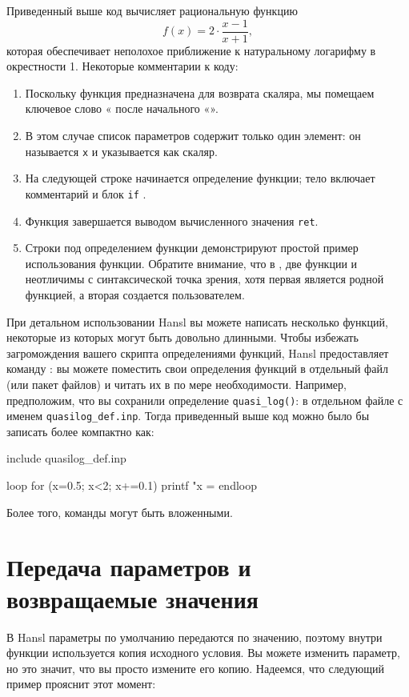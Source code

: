 Приведенный выше код вычисляет рациональную функцию
\[
  f(x) = 2 \cdot \frac{x-1}{x+1} ,
\]
которая обеспечивает неполохое приближение к натуральному логарифму в
окрестности 1. Некоторые комментарии к коду:
\begin{enumerate}
\item Поскольку функция предназначена для возврата скаляра, мы
  помещаем ключевое слово « после начального
  «».
\item В этом случае список параметров содержит только один элемент: он
  называется \texttt{x} и указывается как скаляр.
\item На следующей строке начинается определение функции; тело
  включает комментарий и блок \texttt{if} .
\item Функция завершается выводом вычисленного значения \texttt{ret}.
\item Строки под определением функции демонстрируют простой пример
  использования функции.  Обратите внимание, что в , две
  функции  и  неотличимы с синтаксической
  точка зрения, хотя первая является родной функцией, а вторая
  создается пользователем.
\end{enumerate}

При детальном использовании Hansl вы можете написать несколько
функций, некоторые из которых могут быть довольно длинными. Чтобы
избежать загромождения вашего скрипта определениями функций, Hansl
предоставляет команду : вы можете поместить свои
определения функций в отдельный файл (или пакет файлов) и читать их в
по мере необходимости. Например, предположим, что вы сохранили
определение \verb|quasi_log()|: в отдельном файле с именем
\verb|quasilog_def.inp|. Тогда приведенный выше код можно было бы
записать более компактно как:

\begin{code}
include quasilog_def.inp

loop for (x=0.5; x<2; x+=0.1)
   printf "x = %
endloop
\end{code}
Более того, команды  могут быть вложенными.


\section{Передача параметров и возвращаемые значения}
\label{sec:params-returns}

В Hansl параметры по умолчанию передаются по значению, поэтому внутри
функции используется копия исходного условия. Вы можете изменить
параметр, но это значит, что вы просто измените его копию. Надеемся,
что следующий пример прояснит этот момент:


